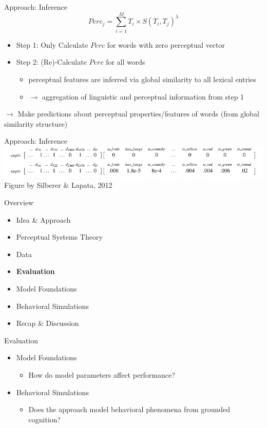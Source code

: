 \documentclass[12pt,a4paper]{beamer}
\begin{document}
\begin{frame}{Approach: Inference}
$$ Perc_{j} = \sum_{i=1}^{M}{T_{i} \times S(T_{i}, T_{j})^{\lambda} } $$
\begin{itemize}
\item Step 1: Only Calculate $Perc$ for words with zero perceptual vector
\item Step 2: (Re)-Calculate $Perc$ for all words
    \begin{itemize}
    \item perceptual features are inferred via global similarity to all lexical entries
    \item $\to$ aggregation of linguistic and perceptual information from step 1
    \end{itemize}
\end{itemize}
$\to$ Make predictions about perceptual properties/features of words (from global similarity structure)
\end{frame}

\begin{frame}{Approach: Inference}
\includegraphics[width=\textwidth]{silber_lapata_example_lexical_representation_and_inference_figure_3.png}
\\
\scriptsize{Figure by Silberer \& Lapata, 2012 \cite{silberer}}
\end{frame}


\begin{frame}{Overview}
\begin{itemize}
\item Idea \& Approach 
\item Perceptual Systems Theory
\item Data
\item \textbf{Evaluation}
    \item Model Foundations
    \item Behavioral Simulations
\item Recap \& Discussion
\end{itemize}
\end{frame}




\begin{frame}{Evaluation}
\begin{itemize}
    \item Model Foundations
        \begin{itemize}
        \item How do model parameters affect performance?
        \end{itemize}
    \item Behavioral Simulations
        \begin{itemize}
        \item Does the approach model behavioral phenomena from grounded cognition?
        \end{itemize}
\end{itemize}
\end{frame}
\end{document}
